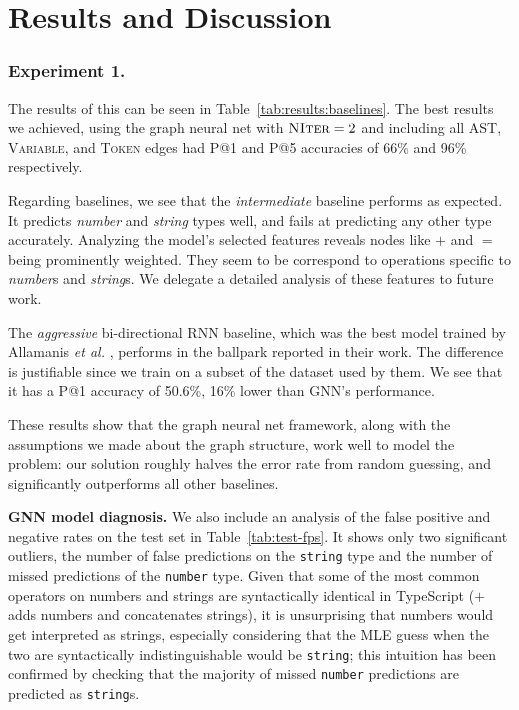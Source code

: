 \section{Results and Discussion}
\label{sec:results}

\subsubsection{Experiment 1.}
The results of this can be seen in Table~\ref{tab:results:baselines}.
The best results we achieved, using the graph neural net with $\textsc{NIter}=2$ and including all AST, \textsc{Variable}, and \textsc{Token} edges had P@1 and P@5 accuracies of 66\% and 96\% respectively.

Regarding baselines, we see that the \textit{intermediate} baseline performs as expected. It predicts \textit{number} and \textit{string} types well, and fails at predicting any other type accurately. Analyzing the model's selected features reveals nodes like $+$ and $=$ being prominently weighted. They seem to be correspond to operations specific to \textit{number}s and \textit{string}s. We delegate a detailed analysis of these features to future work.

The \textit{aggressive} bi-directional RNN baseline, which was the best model trained by Allamanis \textit{et al.} \cite{hellendoorn2018deep}, performs in the ballpark reported in their work. The difference is justifiable since we train on a subset of the dataset used by them. We see that it has a P@1 accuracy of 50.6\%, 16\% lower than GNN's performance.

These results show that the graph neural net framework, along with the assumptions we made about the graph structure, work well to model the problem: our solution roughly halves the error rate from random guessing, and significantly outperforms all other baselines.

\textbf{GNN model diagnosis.} We also include an analysis of the false positive and negative rates on the test set in Table~\ref{tab:test-fps}. It shows only two significant outliers, the number of false predictions on the \texttt{string} type and the number of missed predictions of the \texttt{number} type.
Given that some of the most common operators on numbers and strings are syntactically identical in TypeScript ($+$ adds numbers and concatenates strings), it is unsurprising that numbers would get interpreted as strings, especially considering that the MLE guess when the two are syntactically indistinguishable would be \texttt{string}; this intuition has been confirmed by checking that the majority of missed \texttt{number} predictions are predicted as \texttt{string}s.


